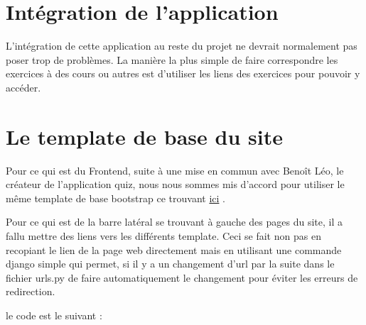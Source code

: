 \documentclass[letterpaper,10pt,english]{sphinxmanual}
\begin{document}
\section{Intégration de l'application}
\label{projet_debut:integration-de-l-application}
L'intégration de cette application au reste du projet ne devrait normalement pas poser trop de problèmes. La manière la plus simple de faire correspondre les exercices à des cours ou autres est
d'utiliser les liens des exercices pour pouvoir y accéder.


\section{Le template de base du site}
\label{projet_debut:le-template-de-base-du-site}
Pour ce qui est du Frontend, suite à une mise en commun avec Benoît Léo, le créateur de l'application quiz, nous nous sommes mis d'accord pour utiliser le même
template de base bootstrap ce trouvant \href{http://startbootstrap.com/template-overviews/shop-item/}{ici} .

Pour ce qui est de la barre latéral se trouvant à gauche des pages du site, il a fallu mettre des liens vers les différents template. Ceci se fait non pas en recopiant le lien
de la page web directement mais en utilisant une commande django simple qui permet, si il y a un changement d'url par la suite dans le fichier urls.py de faire automatiquement le changement
pour éviter les erreurs de redirection.

le code est le suivant :
\end{document}
